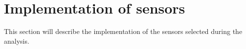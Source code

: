 \section{Implementation of sensors}\label{sub:implementation_of_sensors}
This section will describe the implementation of the sensors selected during the analysis.

